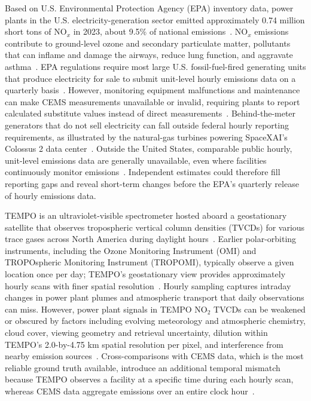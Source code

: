 \documentclass[sigconf,nonacm]{acmart}
\newcommand{\NOx}{NO$_x$}
\begin{document}
Based on U.S. Environmental Protection Agency (EPA) inventory data, power plants
in the U.S. electricity-generation sector emitted approximately 0.74 million
short tons of \NOx{} in 2023, about 9.5\% of national
emissions~\cite{epa2026emissionsTrends}. \NOx{} emissions contribute to
ground-level ozone and secondary particulate matter, pollutants that can
inflame and damage the airways, reduce lung function, and aggravate
asthma~\cite{epa2016noxHealth}. EPA regulations require most large U.S.
fossil-fuel-fired generating units that produce electricity for sale to submit
unit-level hourly emissions data on a quarterly basis~\cite{epa2026powerMonitoring}.
However, monitoring equipment malfunctions and maintenance can make CEMS
measurements unavailable or invalid, requiring plants to report calculated
substitute values instead of direct measurements~\cite{epa2021substitute}.
Behind-the-meter generators that do not sell electricity can fall outside
federal hourly reporting requirements, as illustrated by the natural-gas
turbines powering SpaceXAI's Colossus 2 data center~\cite{gauld2026dataCenter}.
Outside the United States, comparable public hourly, unit-level emissions data
are generally unavailable, even where facilities continuously monitor
emissions~\cite{huang2026detectability}. Independent estimates could therefore
fill reporting gaps and reveal short-term changes before the EPA's quarterly release
of hourly emissions data.

TEMPO is an ultraviolet-visible spectrometer hosted aboard a geostationary satellite
that observes tropospheric vertical column densities (TVCDs) for various trace gases
across North America during daylight hours~\cite{zoogman2017tempo}. Earlier polar-orbiting
instruments, including the Ozone Monitoring Instrument (OMI) and TROPOspheric Monitoring
Instrument (TROPOMI), typically observe a given location once per day; TEMPO's geostationary
view provides approximately hourly scans with finer spatial
resolution~\cite{levelt2006omi,veefkind2012tropomi,zoogman2017tempo}. Hourly sampling
captures intraday changes in power plant plumes and atmospheric transport that daily
observations can miss. However, power plant signals in TEMPO NO$_2$ TVCDs can be weakened
or obscured by factors including evolving meteorology and atmospheric chemistry, cloud cover,
viewing geometry and retrieval uncertainty, dilution within TEMPO's 2.0-by-4.75 km spatial resolution
per pixel, and interference from nearby emission sources~\cite{tempo2026userGuide,huang2026detectability,gauld2026dataCenter}.
Cross-comparisons with CEMS data, which is the most reliable ground truth available, introduce an
additional temporal mismatch because TEMPO observes a facility at a specific time during each hourly scan,
whereas CEMS data aggregate emissions over an entire clock hour~\cite{tempo2026userGuide,epa2026powerMonitoring}.
\end{document}
